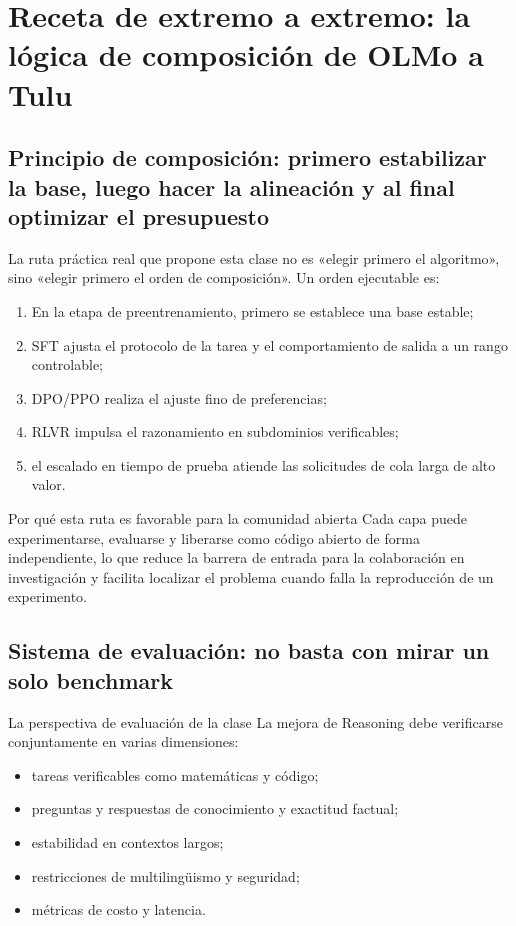 \documentclass[a4paper]{article}
\begin{document}
\section{Receta de extremo a extremo: la lógica de composición de OLMo a Tulu}

\subsection{Principio de composición: primero estabilizar la base, luego hacer la alineación y al final optimizar el presupuesto}
La ruta práctica real que propone esta clase no es «elegir primero el algoritmo», sino «elegir primero el orden de composición». Un orden ejecutable es:
\begin{enumerate}
    \item En la etapa de preentrenamiento, primero se establece una base estable;
    \item SFT ajusta el protocolo de la tarea y el comportamiento de salida a un rango controlable;
    \item DPO/PPO realiza el ajuste fino de preferencias;
    \item RLVR impulsa el razonamiento en subdominios verificables;
    \item el escalado en tiempo de prueba atiende las solicitudes de cola larga de alto valor.
\end{enumerate}

\begin{knowledgebox}{Por qué esta ruta es favorable para la comunidad abierta}
Cada capa puede experimentarse, evaluarse y liberarse como código abierto de forma independiente, lo que reduce la barrera de entrada para la colaboración en investigación y facilita localizar el problema cuando falla la reproducción de un experimento.
\end{knowledgebox}

\subsection{Sistema de evaluación: no basta con mirar un solo benchmark}
\begin{importantbox}{La perspectiva de evaluación de la clase}
La mejora de Reasoning debe verificarse conjuntamente en varias dimensiones:
\begin{itemize}
    \item tareas verificables como matemáticas y código;
    \item preguntas y respuestas de conocimiento y exactitud factual;
    \item estabilidad en contextos largos;
    \item restricciones de multilingüismo y seguridad;
    \item métricas de costo y latencia.
\end{itemize}
\end{importantbox}
\end{document}

